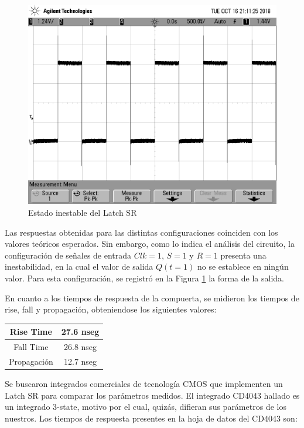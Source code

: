 \begin{figure}[H]
\begin{center}
\includegraphics[scale=0.25]{ejercicio6/sr_1.png}
\caption{Estado inestable del Latch SR} \label{6_fig4}
\end{center}
\end{figure}

Las respuestas obtenidas para las distintas configuraciones coinciden con los valores teóricos esperados. Sin embargo, como lo indica el análisis del circuito, la configuración de señales de entrada $Clk=1$, $S=1$ y $R=1$ presenta una inestabilidad, en la cual el valor de salida $Q(t=1)$ no se establece en ningún valor. Para esta configuración, se registró en la Figura \ref{6_fig4} la forma de la salida.

En cuanto a los tiempos de respuesta de la compuerta, se midieron los tiempos de rise, fall y propagación, obteniendose los siguientes valores:

\begin{center}
\begin{tabular}{|c|c|}
\hline 
Rise Time & 27.6 nseg \\ 
\hline 
Fall Time & 26.8 nseg \\ 
\hline 
Propagación & 12.7 nseg \\ 
\hline 
\end{tabular} 
\end{center}

Se buscaron integrados comerciales de tecnología CMOS que implementen un Latch SR para comparar los parámetros medidos. El integrado CD4043 hallado es un integrado 3-state, motivo por el cual, quizás, difieran sus parámetros de los nuestros. Los tiempos de respuesta presentes en la hoja de datos del CD4043 son:

